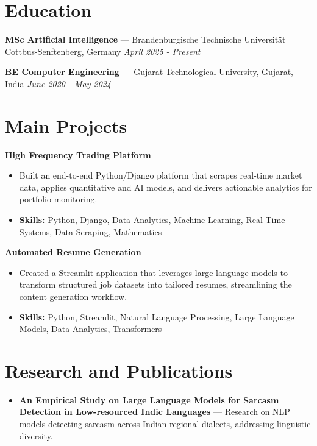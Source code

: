 \documentclass[a4paper,10pt]{article}
\begin{document}
\section*{Education}
\textbf{MSc Artificial Intelligence} — Brandenburgische Technische Universität Cottbus-Senftenberg, Germany \hfill \textit{April 2025 - Present}\par
\vspace{1.5pt}
\textbf{BE Computer Engineering} — Gujarat Technological University, Gujarat, India \hfill \textit{June 2020 - May 2024}\par

\section*{Main Projects}
\textbf{High Frequency Trading Platform}\par
\vspace{1pt}
\begin{itemize}
  \item Built an end-to-end Python/Django platform that scrapes real-time market data, applies quantitative and AI models, and delivers actionable analytics for portfolio monitoring.
  \item \textbf{Skills:} Python, Django, Data Analytics, Machine Learning, Real-Time Systems, Data Scraping, Mathematics
\end{itemize}
\vspace{3pt}
\textbf{Automated Resume Generation}\par
\vspace{1pt}
\begin{itemize}
  \item Created a Streamlit application that leverages large language models to transform structured job datasets into tailored resumes, streamlining the content generation workflow.
  \item \textbf{Skills:} Python, Streamlit, Natural Language Processing, Large Language Models, Data Analytics, Transformers
\end{itemize}

\section*{Research and Publications}
\begin{itemize}
\item \textbf{An Empirical Study on Large Language Models for Sarcasm Detection in Low-resourced Indic Languages} — Research on NLP models detecting sarcasm across Indian regional dialects, addressing linguistic diversity.
\end{itemize}
\end{document}
